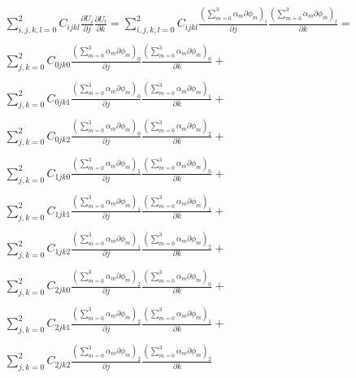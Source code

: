 \documentclass[a4paper,12pt]{article}
\begin{document}
\begin{equation}
    \begin{array}{c}
    \sum_{i,j,k,l=0}^2 C_{ijkl}\frac{\partial U_i}{\partial j}\frac{\partial U_l}{\partial k}=
    \sum_{i,j,k,l=0}^2 C_{ijkl}\frac{(\sum_{m=0}^3\alpha_m\partial\phi_m)_i}
    {\partial j}\frac{(\sum_{m=0}^3\alpha_m\partial\phi_m)_l}{\partial k}= \\ \\

    \sum_{j,k=0}^2 C_{0jk0}\frac{(\sum_{m=0}^3\alpha_m\partial\phi_m)_0}
    {\partial j}\frac{(\sum_{m=0}^3\alpha_m\partial\phi_m)_0}{\partial k}+ \\ \\

    \sum_{j,k=0}^2 C_{0jk1}\frac{(\sum_{m=0}^3\alpha_m\partial\phi_m)_0}
    {\partial j}\frac{(\sum_{m=0}^3\alpha_m\partial\phi_m)_1}{\partial k}+ \\ \\

    \sum_{j,k=0}^2 C_{0jk2}\frac{(\sum_{m=0}^3\alpha_m\partial\phi_m)_0}
    {\partial j}\frac{(\sum_{m=0}^3\alpha_m\partial\phi_m)_2}{\partial k}+ \\ \\


    \sum_{j,k=0}^2 C_{1jk0}\frac{(\sum_{m=0}^3\alpha_m\partial\phi_m)_1}
    {\partial j}\frac{(\sum_{m=0}^3\alpha_m\partial\phi_m)_0}{\partial k}+ \\ \\

    \sum_{j,k=0}^2 C_{1jk1}\frac{(\sum_{m=0}^3\alpha_m\partial\phi_m)_1}
    {\partial j}\frac{(\sum_{m=0}^3\alpha_m\partial\phi_m)_1}{\partial k}+ \\ \\

    \sum_{j,k=0}^2 C_{1jk2}\frac{(\sum_{m=0}^3\alpha_m\partial\phi_m)_1}
    {\partial j}\frac{(\sum_{m=0}^3\alpha_m\partial\phi_m)_2}{\partial k}+ \\ \\


    \sum_{j,k=0}^2 C_{2jk0}\frac{(\sum_{m=0}^3\alpha_m\partial\phi_m)_2}
    {\partial j}\frac{(\sum_{m=0}^3\alpha_m\partial\phi_m)_0}{\partial k}+ \\ \\

    \sum_{j,k=0}^2 C_{2jk1}\frac{(\sum_{m=0}^3\alpha_m\partial\phi_m)_2}
    {\partial j}\frac{(\sum_{m=0}^3\alpha_m\partial\phi_m)_1}{\partial k}+ \\ \\

    \sum_{j,k=0}^2 C_{2jk2}\frac{(\sum_{m=0}^3\alpha_m\partial\phi_m)_2}
    {\partial j}\frac{(\sum_{m=0}^3\alpha_m\partial\phi_m)_2}{\partial k} \\ \\
\end{array}
\end{equation} 
\end{document}
